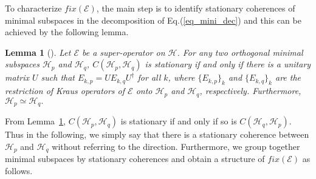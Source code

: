\documentclass[journal]{IEEEtran}
\def\h{\ensuremath{\mathcal{H}}}
\def\e{\ensuremath{\mathcal{E}}}
\newtheorem{lemma}{Lemma}
\begin{document}
To characterize $fix(\e)$, the main step is to identify stationary coherences of minimal subspaces in  the decomposition of Eq.(\ref{eq_mini_dec}) and this can be achieved  by the following lemma.

\begin{lemma}[\cite{baumgartner2012structure}]\label{Lem_SC}
  Let $\e$ be a super-operator on $\h$. For any two orthogonal minimal subspaces $\h_p$ and $\h_q$,  $C(\h_p,\h_q)$ is stationary if and only if there is a unitary matrix $U$ such that 
  $E_{k,p}=UE_{k,q}U^\dagger$ for all $k$, where $\{E_{k,p}\}_k$ and $\{E_{k,q}\}_k$ are the restriction of  Kraus operators of $\e$ onto $\h_p$ and $\h_q$, respectively.  Furthermore, $\h_p\simeq\h_q.$
\end{lemma}

 From Lemma~\ref{Lem_SC}, $C(\h_p,\h_q)$ is stationary if and only if so is $C(\h_q,\h_p)$. Thus in the following, we simply say that there is a stationary coherence between $\h_p$ and $\h_q$ without referring to the direction.
Furthermore,  we group together minimal subspaces by stationary coherences and obtain a structure of $fix(\e)$ as follows. 
\end{document}
